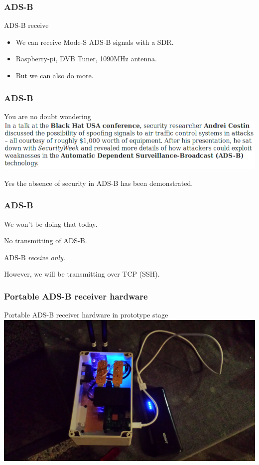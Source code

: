 \begin{frame}
\frametitle{ADS-B}
\begin{block}{ADS-B receive}
\begin{itemize}
\item<1-> We can receive Mode-S ADS-B signals with a SDR.
\item<2-> Raspberry-pi, DVB Tuner, 1090MHz antenna.
\item<3-> But we can also do more.
\end{itemize}
\end{block}
\end{frame}

\begin{frame}
\frametitle{ADS-B}
\begin{block}{You are no doubt wondering}
\includegraphics[height=0.18\textheight]{image/adsb-security.png}
\end{block}
Yes the absence of security in ADS-B has been demonstrated.
\end{frame}

\begin{frame}
\frametitle{ADS-B}
\begin{center}
We won't be doing that today.
\par
No transmitting of ADS-B.
\par
ADS-B \emph{receive only}.
\par
However, we will be transmitting over TCP (SSH).
\end{center}
\end{frame}

\begin{frame}
\frametitle{Portable ADS-B receiver hardware}
\begin{block}{Portable ADS-B receiver hardware in prototype stage}
\includegraphics[height=0.5\textheight]{image/adsb-hardware-prototype.png}
\end{block}
\end{frame}

